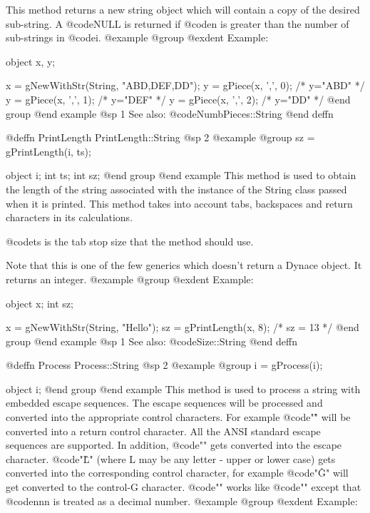 This method returns a new string object which will contain a copy of the
desired sub-string.  A @code{NULL} is returned if @code{n} is greater
than the number of sub-strings in @code{i}.
@example
@group
@exdent Example:

object  x, y;

x = gNewWithStr(String, "ABD,DEF,DD");
y = gPiece(x, ',', 0);  /*  y="ABD"  */
y = gPiece(x, ',', 1);  /*  y="DEF"  */
y = gPiece(x, ',', 2);  /*  y="DD"   */
@end group
@end example
@sp 1
See also:  @code{NumbPieces::String}
@end deffn























@deffn {PrintLength} PrintLength::String
@sp 2
@example
@group
sz = gPrintLength(i, ts);

object  i;
int     ts;
int     sz;
@end group
@end example
This method is used to obtain the length of the string associated with
the instance of the String class passed when it is printed.  This
method takes into account tabs, backspaces and return characters in
its calculations.

@code{ts} is the tab stop size that the method should use.

Note that this is one of the few generics which doesn't return a Dynace
object.  It returns an integer.
@example
@group
@exdent Example:

object  x;
int     sz;

x = gNewWithStr(String, "Hello\tWorld\bx");
sz = gPrintLength(x, 8);
/*  sz = 13   */
@end group
@end example
@sp 1
See also:  @code{Size::String}
@end deffn











@deffn {Process} Process::String
@sp 2
@example
@group
i = gProcess(i);

object  i;
@end group
@end example
This method is used to process a string with embedded escape sequences.
The escape sequences will be processed and converted into the appropriate
control characters.  For example @code{"\r"} will be converted into a return
control character.  All the ANSI standard escape sequences are supported.
In addition, @code{"\e"} gets converted into the escape character.
@code{"\^L"} (where L may be any letter - upper or lower case) gets
converted into the corresponding control character, for example
@code{"\^G"} will get converted to the control-G character.
@code{"\dnnn"} works like @code{"\xnnn"} except that @code{nnn} is
treated as a decimal number.
@example
@group
@exdent Example:

